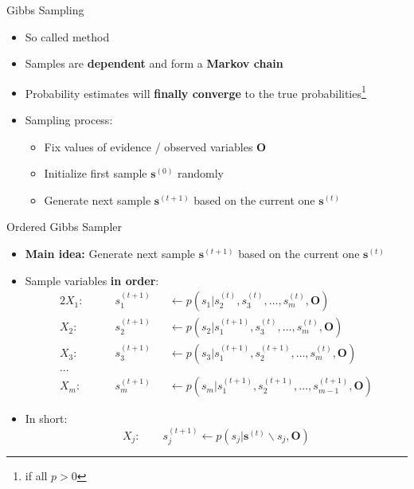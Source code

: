 \begin{frame}{Gibbs Sampling}{}
	\begin{itemize}
		\item So called  method
		\item Samples are \textbf{dependent} and form a \textbf{Markov chain}
		\item Probability estimates will \textbf{finally converge} to the true probabilities\footnote[frame]{if all $p > 0$}
		\item Sampling process:
		\begin{itemize}
			\item Fix values of evidence / observed variables $\bm{O}$
			\item Initialize first sample $\bm{s}^{(0)}$ randomly
			\item Generate next sample $\bm{s}^{(t+1)}$ based on the current one $\bm{s}^{(t)}$
		\end{itemize}
	\end{itemize}
\end{frame}


\begin{frame}{Ordered Gibbs Sampler}{}
	\begin{itemize}
		\item \textbf{Main idea:} Generate next sample $\bm{s}^{(t+1)}$ based on the current one $\bm{s}^{(t)}$
		\item Sample variables \textbf{in order}:
		{\footnotesize
		\begin{alignat*}{2}
			X_1: 	&\qquad s_1^{(t+1)} 	&&\longleftarrow
						p(s_1 \vert s_2^{(t)}, s_3^{(t)}, \dots, s_m^{(t)}, \bm{O}) \\
			X_2: 	&\qquad s_2^{(t+1)} 	&&\longleftarrow
						p(s_2 \vert s_1^{(t+1)}, s_3^{(t)}, \dots, s_m^{(t)}, \bm{O}) \\
			X_3: 	&\qquad s_3^{(t+1)} 	&&\longleftarrow
						p(s_3 \vert s_1^{(t+1)}, s_2^{(t+1)}, \dots, s_m^{(t)}, \bm{O}) \\
			... \\
			X_m: 	&\qquad s_m^{(t+1)} 	&&\longleftarrow
						p(s_m \vert s_1^{(t+1)}, s_2^{(t+1)}, \dots, s_{m-1}^{(t+1)}, \bm{O})
		\end{alignat*}}
		\item In short:
		{\footnotesize
		\begin{equation*}
			X_j: \qquad s_j^{(t+1)} \longleftarrow p(s_j \vert \bm{s}^{(t)} \backslash s_j, \bm{O})
		\end{equation*}}
	\end{itemize}
\end{frame}


